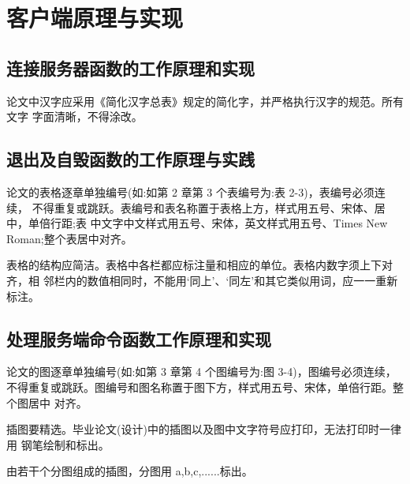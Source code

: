 


\chapter{客户端原理与实现}
 
\section{连接服务器函数的工作原理和实现}

论文中汉字应采用《简化汉字总表》规定的简化字，并严格执行汉字的规范。所有文字 字面清晰，不得涂改。

\section{退出及自毁函数的工作原理与实践}
论文的表格逐章单独编号(如:如第 2 章第 3 个表编号为:表 2-3)，表编号必须连续， 不得重复或跳跃。表编号和表名称置于表格上方，样式用五号、宋体、居中，单倍行距;表 中文字中文样式用五号、宋体，英文样式用五号、Times New Roman;整个表居中对齐。

表格的结构应简洁。表格中各栏都应标注量和相应的单位。表格内数字须上下对齐，相 邻栏内的数值相同时，不能用‘同上’、‘同左’和其它类似用词，应一一重新标注。
\section{处理服务端命令函数工作原理和实现}

论文的图逐章单独编号(如:如第 3 章第 4 个图编号为:图 3-4)，图编号必须连续， 不得重复或跳跃。图编号和图名称置于图下方，样式用五号、宋体，单倍行距。整个图居中 对齐。

插图要精选。毕业论文(设计)中的插图以及图中文字符号应打印，无法打印时一律用 钢笔绘制和标出。

由若干个分图组成的插图，分图用 a,b,c,......标出。

